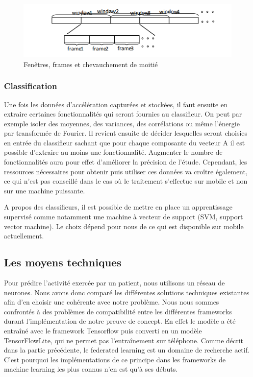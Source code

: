 \documentclass{article}
\begin{document}
\begin{figure}[!ht]
    \centering
    \includegraphics[scale=0.8]{overlapping_explanation.PNG}
    \caption{Fenêtres, frames et chevauchement de moitié            \cite{SunActivityRecognitionAccelerometer2010a}
    }
\end{figure}

\subsubsection{Classification}

Une fois les données d'accélération capturées et stockées, il faut ensuite en extraire certaines fonctionnalités qui seront fournies au classifieur. On peut par exemple isoler des moyennes, des variances, des corrélations ou même l'énergie par transformée de Fourier. Il revient ensuite de décider lesquelles seront choisies en entrée du classifieur sachant que pour chaque composante du vecteur A il est possible d'extraire au moins une fonctionnalité.
Augmenter le nombre de fonctionnalités aura pour effet d'améliorer la précision de l'étude. Cependant, les ressources nécessaires pour obtenir puis utiliser ces données va croître également, ce qui n'est pas conseillé dans le cas où le traitement s'effectue sur mobile et non sur une machine puissante.

A propos des classifieurs, il est possible de mettre en place un apprentissage supervisé comme notamment une machine à vecteur de support (SVM, support vector machine). Le choix dépend pour nous de ce qui est disponible sur mobile actuellement.

\subsection{Les moyens techniques}

Pour prédire l'activité exercée par un patient, nous utilisons un réseau de neurones. Nous avons donc comparé les différentes solutions techniques existantes afin d'en choisir une cohérente avec notre problème. Nous nous sommes confrontés à des problèmes de compatibilité entre les différentes frameworks durant l'implémentation de notre preuve de concept. En effet le modèle a été entraîné avec le framework Tensorflow puis converti en un modèle TensorFlowLite, qui ne permet pas l'entraînement sur téléphone. Comme décrit dans la partie précédente, le federated learning est un domaine de recherche actif. C'est pourquoi les implémentations de ce principe dans les frameworks de machine learning les plus connus n'en est qu'à ses débuts.
\end{document}
